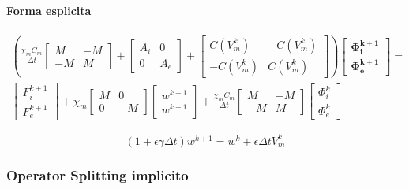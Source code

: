 \documentclass[a4paper]{article}
\theoremstyle{definition}
\begin{document}
\paragraph{Forma esplicita}
\begin{equation}
\begin{gathered}
\left( \frac{\chi_m C_m}{\Delta t} \begin{bmatrix} M & -M \\ -M & M \end{bmatrix} + \begin{bmatrix} A_i & 0 \\ 0 & A_e \end{bmatrix} + 
\begin{bmatrix}
C(V_m^k) & -C(V_m^k) \\ -C(V_m^k) & C(V_m^k)
\end{bmatrix}\right)
\begin{bmatrix} \bm{\Phi_i^{k+1}} \\ \bm{\Phi_e^{k+1}} \end{bmatrix} = 
\\
\begin{bmatrix} F_i^{k+1} \\ F_e^{k+1} \end{bmatrix} 
+ \chi_m \begin{bmatrix}M & 0 \\ 0 & -M \end{bmatrix}
\begin{bmatrix} w^{k+1} \\ w^{k+1} \end{bmatrix}
+ \frac{\chi_m C_m}{\Delta t} \begin{bmatrix}M & -M \\ -M & M\end{bmatrix}
\begin{bmatrix} \Phi_i^{k} \\ \Phi_e^{k} \end{bmatrix}
\end{gathered}
\end{equation}

\vspace{5mm}
\begin{equation}
(1+\epsilon \gamma \Delta t)w^{k+1} = w^k + \epsilon \Delta t V_m^k
\end{equation}

\newpage
\subsubsection{Operator Splitting implicito}
\end{document}

